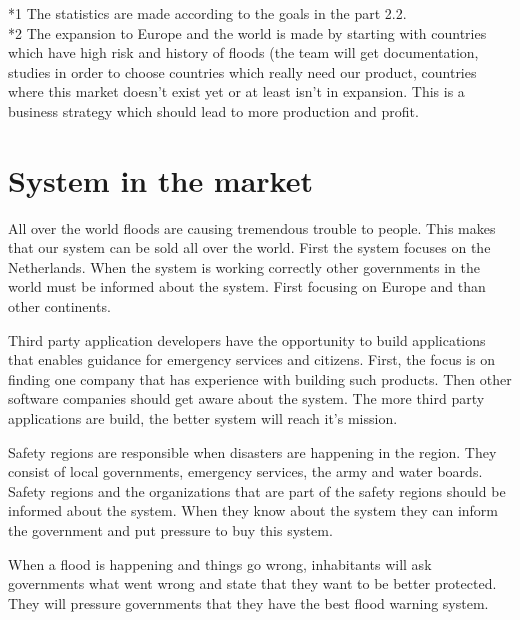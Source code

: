 *1 The statistics are made according to the goals in the part 2.2. \\
*2 The expansion to Europe and the world is made by starting with countries which have high risk and history of floods (the team will get documentation, studies in order to choose countries which really need our product, countries where this market doesn't exist yet or at least isn't in expansion. This is a business strategy which should lead to more production and profit.\\

\section{System in the market}
All over the world floods are causing tremendous trouble to people. This makes that our system can be sold all over the world. First the system focuses on the Netherlands. When the system is working correctly other governments in the world must be informed about the system. First focusing on Europe and than other continents.

Third party application developers have the opportunity to build applications that enables guidance for emergency services and citizens. First, the focus is on finding one company that has experience with building such products. Then other software companies should get aware about the system. The more third party applications are build, the better system will reach it's mission.

Safety regions are responsible when disasters are happening in the region. They consist of local governments, emergency services, the army and water boards. Safety regions and the organizations that are part of the safety regions should be informed about the system. When they know about the system they can inform the government and put pressure to buy this system.

When a flood is happening and things go wrong, inhabitants will ask governments what went wrong and state that they want to be better protected. They will pressure governments that they have the best flood warning system.

